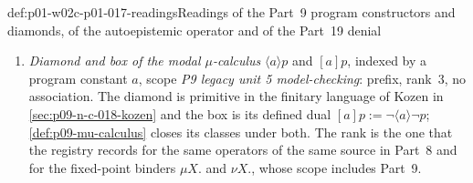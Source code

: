 \begin{hbconvention}{def:p01-w02c-p01-017-readings}{Readings of the Part~9 program constructors and diamonds, of the autoepistemic operator and of the Part~19 denial}
\begin{enumerate}
  \(\langle\alpha\rangle(\langle\beta\rangle X)\) and
  \(\neg\langle\alpha\rangle\neg X\) is
  \(\neg(\langle\alpha\rangle(\neg X))\).  The rank is that of the box of
  the same scope, so the two dual modalities read alike, and it is the
  rank that the registry records for the indexed diamonds of Part~8
  (\cref{def:p08-bvb501-language}, and the program modalities of Kozen in
  \cref{sec:p08-conditionals-deontic-free}).
\item \emph{Diamond and box of the modal \(\mu\)-calculus}
  \(\langle a\rangle p\) and \([a]p\), indexed by a program constant
  \(a\), scope \emph{P9 legacy unit 5 model-checking}: prefix, rank~3,
  no association.  The diamond is primitive in the finitary language of
  Kozen in \cref{sec:p09-n-c-018-kozen} and the box is its defined dual
  \([a]p:=\neg\langle a\rangle\neg p\); \cref{def:p09-mu-calculus} closes
  its classes under both.  The rank is the one that the registry records
  for the same operators of the same source in Part~8 and for the
  fixed-point binders \(\mu X.\) and \(\nu X.\), whose scope includes
  Part~9.
\end{enumerate}
\end{hbconvention}

